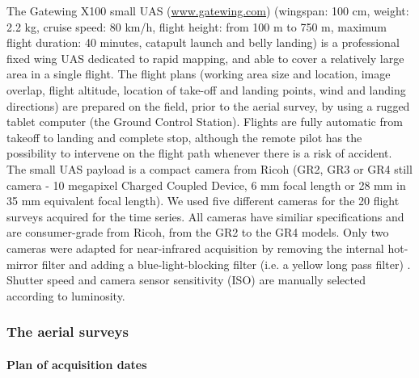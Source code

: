 \documentclass[remotesensing,article,submit,moreauthors,pdftex,12pt,a4paper]{mdpi} %
\begin{document}
The Gatewing X100 small UAS (\url{www.gatewing.com}) (wingspan: 100 cm, weight: 2.2 kg, cruise speed: 80 km/h, flight height: from 100 m to 750 m, maximum flight duration: 40 minutes, catapult launch and belly landing) is a professional fixed wing UAS dedicated to rapid mapping, and able to cover a relatively large area in a single flight. 
The flight plans (working area size and location, image overlap, flight altitude, location of take-off and landing points, wind and landing directions) are prepared on the field, prior to the aerial survey, by using a rugged tablet computer (the Ground Control Station). 
Flights are fully automatic from takeoff to landing and complete stop, although the remote pilot has the possibility to intervene on the flight path whenever there is a risk of accident. 
The small UAS payload is a compact camera from Ricoh (GR2, GR3 or GR4 still camera - 10 megapixel Charged Coupled Device, 6 mm focal length or 28 mm in 35 mm equivalent focal length). 
We used five different cameras for the 20 flight surveys acquired for the time series. 
All cameras have similiar specifications and are consumer-grade from Ricoh, from the GR2 to the GR4 models. 
Only two cameras were adapted for near-infrared acquisition by removing the internal hot-mirror filter and adding a blue-light-blocking filter (i.e. a yellow long pass filter) \citep{aber_small-format_2010}. 
Shutter speed and camera sensor sensitivity (ISO) are manually selected according to luminosity.


\subsubsection{The aerial surveys}

\paragraph{Plan of acquisition dates}
\end{document}
